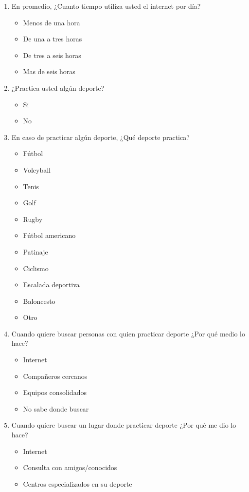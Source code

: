 \begin{enumerate}
\begin{itemize}
  \end{itemize}
  \item En promedio, ¿Cuanto tiempo utiliza usted el internet por día?
  \begin{itemize}
    \item Menos de una hora
    \item De una a tres horas
    \item De tres a seis horas
    \item Mas de seis horas
  \end{itemize}
  \item ¿Practica usted algún deporte?
  \begin{itemize}
    \item Si
    \item No
  \end{itemize}
  \item En caso de practicar algún deporte, ¿Qué deporte practica?
  \begin{itemize}
    \item Fútbol
    \item Voleyball
    \item Tenis
    \item Golf
    \item Rugby
    \item Fútbol americano
    \item Patinaje
    \item Ciclismo
    \item Escalada deportiva
    \item Baloncesto
    \item Otro
  \end{itemize}
  \item Cuando quiere buscar personas con quien practicar deporte ¿Por qué medio lo hace?
  \begin{itemize}
    \item Internet
    \item Compañeros cercanos
    \item Equipos consolidados
    \item No sabe donde buscar
  \end{itemize}
  \item Cuando quiere buscar un lugar donde practicar deporte ¿Por qué me dio lo hace?
  \begin{itemize}
    \item Internet
    \item Consulta con amigos/conocidos
    \item Centros especializados en su deporte

\end{itemize}
\end{enumerate}
